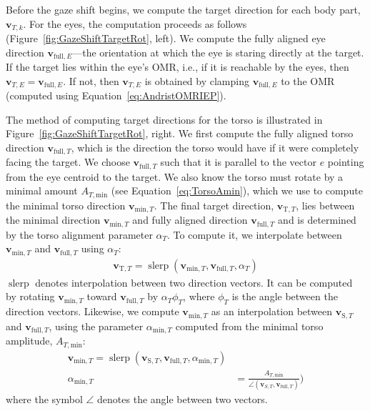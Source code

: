 Before the gaze shift begins, we compute the target direction for each body part, $\mathbf{v}_{T,k}$. For the eyes, the computation proceeds as follows (Figure~\ref{fig:GazeShiftTargetRot}, left). We compute the fully aligned eye direction $\mathbf{v}_{\mathrm{full},E}$---the orientation at which the eye is staring directly at the target. If the target lies within the eye's OMR, i.e., if it is reachable by the eyes, then $\mathbf{v}_{T,E} = \mathbf{v}_{\mathrm{full},E}$. If not, then $\mathbf{v}_{T,E}$ is obtained by clamping $\mathbf{v}_{\mathrm{full},E}$ to the OMR (computed using Equation~\ref{eq:AndristOMRIEP}).

The method of computing target directions for the torso is illustrated in Figure~\ref{fig:GazeShiftTargetRot}, right. We first compute the fully aligned torso direction $\mathbf{v}_{\mathrm{full},T}$, which is the direction the torso would have if it were completely facing the target. We choose $\mathbf{v}_{\mathrm{full},T}$ such that it is parallel to the vector $e$ pointing from the eye centroid to the target. We also know the torso must rotate by a minimal amount $A_{T,\mathrm{min}}$ (see Equation~\ref{eq:TorsoAmin}), which we use to compute the minimal torso direction $\mathbf{v}_{\mathrm{min},T}$. The final target direction, $\mathbf{v}_{\mathrm{T},T}$, lies between the minimal direction $\mathbf{v}_{\mathrm{min},T}$ and fully aligned direction $\mathbf{v}_{\mathrm{full},T}$ and is determined by the torso alignment parameter $\alpha_T$. To compute it, we interpolate between $\mathbf{v}_{\mathrm{min},T}$ and $\mathbf{v}_{\mathrm{full},T}$ using $\alpha_T$:
%
\begin{align} \label{eq:TorsoTargetRot}
\mathbf{v}_{\mathrm{T},T} = \mathop{slerp}(\mathbf{v}_{\mathrm{min},T}, \mathbf{v}_{\mathrm{full},T}, \alpha_T)
\end{align}
%
$\mathop{slerp}$ denotes interpolation between two direction vectors. It can be computed by rotating $\mathbf{v}_{\mathrm{min},T}$ toward $\mathbf{v}_{\mathrm{full},T}$ by $\alpha_T \phi_T$, where $\phi_T$ is the angle between the direction vectors. Likewise, we compute $\mathbf{v}_{\mathrm{min},T}$ as an interpolation between $\mathbf{v}_{\mathrm{S},T}$ and $\mathbf{v}_{\mathrm{full},T}$, using the parameter $\alpha_{\mathrm{min},T}$ computed from the minimal torso amplitude, $A_{T,\mathrm{min}}$:
%
\begin{align} \label{eq:TorsoMinRot}
\mathbf{v}_{\mathrm{min},T} = \mathop{slerp}(\mathbf{v}_{\mathrm{S},T}, \mathbf{v}_{\mathrm{full},T}, \alpha_{\mathrm{min},T}) \\
\alpha_{\mathrm{min},T} &= \frac{A_{T,\mathrm{min}}}{\angle(\mathbf{v}_{S,T}, \mathbf{v}_{\mathrm{full},T})}) \nonumber
\end{align}
%
where the symbol $\angle$ denotes the angle between two vectors.

